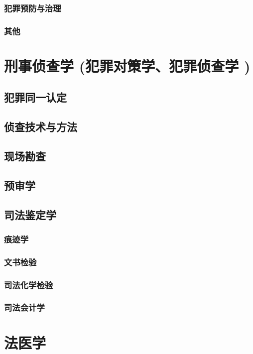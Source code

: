\documentclass[UTF8]{../ApplicationUniverse}
\begin{document}
        \subsubsection{犯罪预防与治理}
        \subsubsection{其他}

\section{刑事侦查学 (犯罪对策学、犯罪侦查学 )}
        \subsection{犯罪同一认定}
        \subsection{侦查技术与方法}
        \subsection{现场勘查}
        \subsection{预审学}
        \subsection{司法鉴定学}
            \subsubsection{痕迹学}
            \subsubsection{文书检验}
            \subsubsection{司法化学检验}
            \subsubsection{司法会计学}

\section{法医学}
\end{document}
